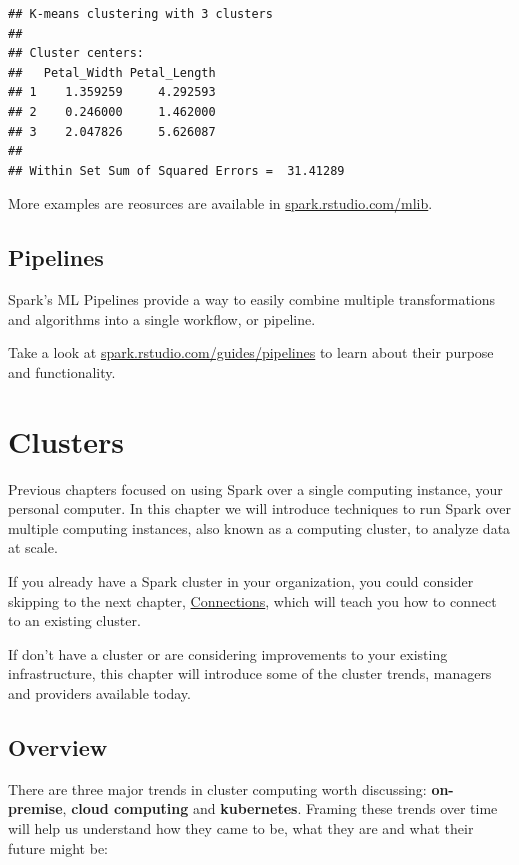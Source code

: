 \documentclass[]{book}
\theoremstyle{definition}
\theoremstyle{definition}
\theoremstyle{definition}
\theoremstyle{remark}
\begin{document}
\begin{verbatim}
## K-means clustering with 3 clusters
## 
## Cluster centers:
##   Petal_Width Petal_Length
## 1    1.359259     4.292593
## 2    0.246000     1.462000
## 3    2.047826     5.626087
## 
## Within Set Sum of Squared Errors =  31.41289
\end{verbatim}

More examples are reosurces are available in
\href{http://spark.rstudio.com/mlib/}{spark.rstudio.com/mlib}.

\hypertarget{pipelines}{%
\section{Pipelines}\label{pipelines}}

Spark's ML Pipelines provide a way to easily combine multiple
transformations and algorithms into a single workflow, or pipeline.

Take a look at
\href{http://spark.rstudio.com/guides/pipelines/}{spark.rstudio.com/guides/pipelines}
to learn about their purpose and functionality.

\hypertarget{clusters}{%
\chapter{Clusters}\label{clusters}}

Previous chapters focused on using Spark over a single computing
instance, your personal computer. In this chapter we will introduce
techniques to run Spark over multiple computing instances, also known as
a computing cluster, to analyze data at scale.

If you already have a Spark cluster in your organization, you could
consider skipping to the next chapter,
\protect\hyperlink{connections-1}{Connections}, which will teach you how
to connect to an existing cluster.

If don't have a cluster or are considering improvements to your existing
infrastructure, this chapter will introduce some of the cluster trends,
managers and providers available today.

\hypertarget{overview-1}{%
\section{Overview}\label{overview-1}}

There are three major trends in cluster computing worth discussing:
\textbf{on-premise}, \textbf{cloud computing} and \textbf{kubernetes}.
Framing these trends over time will help us understand how they came to
be, what they are and what their future might be:
\end{document}
